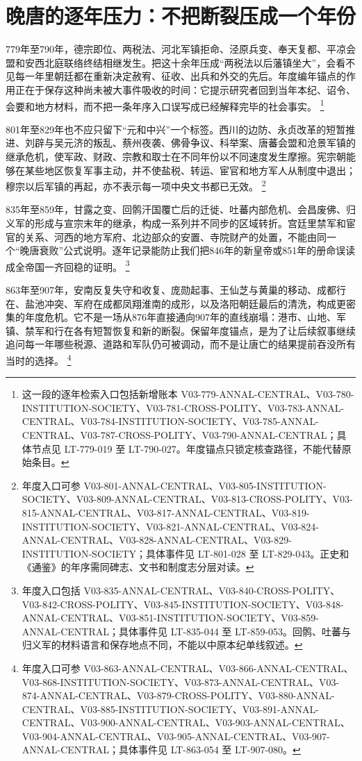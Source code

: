 \section{晚唐的逐年压力：不把断裂压成一个年份}
\label{sec:annual-late-tang-rhythms}

779年至790年，德宗即位、两税法、河北军镇拒命、泾原兵变、奉天复都、平凉会盟和安西北庭联络终结相继发生。把这十余年压成“两税法以后藩镇坐大”，会看不见每一年里朝廷都在重新决定赦宥、征收、出兵和外交的先后。年度编年锚点的作用正在于保存这种尚未被大事件吸收的时间：它提示研究者回到当年本纪、诏令、会要和地方材料，而不把一条年序入口误写成已经解释完毕的社会事实。%
\footnote{这一段的逐年检索入口包括新增账本 V03-779-ANNAL-CENTRAL、V03-780-INSTITUTION-SOCIETY、V03-781-CROSS-POLITY、V03-783-ANNAL-CENTRAL、V03-784-INSTITUTION-SOCIETY、V03-785-ANNAL-CENTRAL、V03-787-CROSS-POLITY、V03-790-ANNAL-CENTRAL；具体节点见 LT-779-019 至 LT-790-027。年度锚点只锁定核查路径，不能代替原始条目。}

801年至829年也不应只留下“元和中兴”一个标签。西川的边防、永贞改革的短暂推进、刘辟与吴元济的叛乱、蔡州夜袭、佛骨争议、科举案、唐蕃会盟和沧景军镇的继承危机，使军政、财政、宗教和取士在不同年份以不同速度发生摩擦。宪宗朝能够在某些地区恢复军事主动，并不使盐税、转运、宦官和地方军人从制度中退出；穆宗以后军镇的再起，亦不表示每一项中央文书都已无效。%
\footnote{年度入口可参 V03-801-ANNAL-CENTRAL、V03-805-INSTITUTION-SOCIETY、V03-809-ANNAL-CENTRAL、V03-813-CROSS-POLITY、V03-815-ANNAL-CENTRAL、V03-817-ANNAL-CENTRAL、V03-819-INSTITUTION-SOCIETY、V03-821-ANNAL-CENTRAL、V03-824-ANNAL-CENTRAL、V03-828-ANNAL-CENTRAL、V03-829-INSTITUTION-SOCIETY；具体事件见 LT-801-028 至 LT-829-043。正史和《通鉴》的年序需同碑志、文书和制度志分层对读。}

835年至859年，甘露之变、回鹘汗国覆亡后的迁徙、吐蕃内部危机、会昌废佛、归义军的形成与宣宗末年的继承，构成一系列并不同步的区域转折。宫廷里禁军和宦官的关系、河西的地方军府、北边部众的安置、寺院财产的处置，不能由同一个“晚唐衰败”公式说明。逐年记录能防止我们把846年的新皇帝或851年的册命误读成全帝国一齐回稳的证明。%
\footnote{年度入口包括 V03-835-ANNAL-CENTRAL、V03-840-CROSS-POLITY、V03-842-CROSS-POLITY、V03-845-INSTITUTION-SOCIETY、V03-848-ANNAL-CENTRAL、V03-851-INSTITUTION-SOCIETY、V03-859-ANNAL-CENTRAL；具体事件见 LT-835-044 至 LT-859-053。回鹘、吐蕃与归义军的材料语言和保存地点不同，不能以中原本纪单线叙述。}

863年至907年，安南反复失守和收复、庞勋起事、王仙芝与黄巢的移动、成都行在、盐池冲突、军府在成都凤翔淮南的成形，以及洛阳朝廷最后的清洗，构成更密集的年度危机。它不是一场从876年直接通向907年的直线崩塌：港市、山地、军镇、禁军和行在各有短暂恢复和新的断裂。保留年度锚点，是为了让后续叙事继续追问每一年哪些税源、道路和军队仍可被调动，而不是让唐亡的结果提前吞没所有当时的选择。%
\footnote{年度入口可参 V03-863-ANNAL-CENTRAL、V03-866-ANNAL-CENTRAL、V03-868-INSTITUTION-SOCIETY、V03-873-ANNAL-CENTRAL、V03-874-ANNAL-CENTRAL、V03-879-CROSS-POLITY、V03-880-ANNAL-CENTRAL、V03-885-INSTITUTION-SOCIETY、V03-891-ANNAL-CENTRAL、V03-900-ANNAL-CENTRAL、V03-903-ANNAL-CENTRAL、V03-904-ANNAL-CENTRAL、V03-905-ANNAL-CENTRAL、V03-907-ANNAL-CENTRAL；具体事件见 LT-863-054 至 LT-907-080。}

